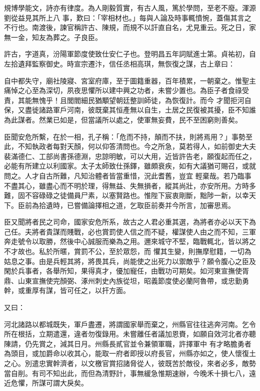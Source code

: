 \begin{pinyinscope}
 規博學能文，詩亦有律度。為人剛毅質實，有古人風，篤於學問，至老不廢。渾源劉從益見其所上八
 事，歎曰：「宰相材也。」每與人論及時事輒憤惋，蓋傷其言之不行也。南渡後，諫官稱許古、陳規，而規不以訐直自名，尤見重云。死之日，家無一金，知友為葬之。子良臣。



 許古，字道真，汾陽軍節度使致仕安仁子也。登明昌五年詞賦進士第。貞祐初，自左拾遺拜監察御史。時宣宗遷汴，信任丞相高琪，無恢復之謀，古上章曰：



 自中都失守，廟社陵寢、宮室府庫，至于圖籍重器，百年積累，一朝棄之。惟聖主痛悼之心至為深切，夙夜思懼所以建中興之功者，未嘗少置也。為臣子者食祿受責，其能無愧乎！且閭閻細民猶顒望朝廷整訓師徒，為恢復計。而今
 才聞拒河自保，又盡徙諸路軍戶河南，彼既棄其恒產無以自生，土居之民復被其擾，臣不知誰為此謀者。然業已如是，但當議所以處之，使軍無妄費，民不至困窮則善矣。



 臣聞安危所繫，在於一相，孔子稱：「危而不持，顛而不扶，則將焉用？」事勢至此，不知執政者每對天顏，何以仰答清問也。今之所急，莫若得人，如前御史大夫裴滿德仁、工部尚書孫德淵，忠諒明敏，可以大用，近皆許告老，願復起而任之，必能有所建立以利國家。太子太師致仕孫鐸，雖頗衰疾，如有大議猶可賜召，或就問之。人才自古所難，凡知治體者皆當重惜，況此耆舊，豈宜
 輕棄哉。若乃臨事不盡其心，雖盡心而不明於理，得無益、失無損者，縱其尚壯，亦安所用。方時多難，固不容碌碌之徒備員尸素，以塞賢路也。惟陛下宸衷剛斷，黜陟一新，以幸天下。臣前為拾遺時，已嘗備論擇相之道，乞取臣前奏并今所言，加審思焉。



 臣又聞將者民之司命，國家安危所系，故古之人君必重其選，為將者亦必以天下為己任。夫將者貴謀而賤戰，必也賞罰使人信之而不疑，權謀使人由之而不知，三軍奔走號令以取勝，然後中心誠服而樂為之用。邇來城守不堅，臨戰輒北，皆以將之不才故也。私於所暱，賞罰不公，至於眾怨，而
 懼其生變，則撫摩慰籍，一切為姑息之事。由是兵輕其將，將畏其兵，尚能使之出死力以禦敵乎？願令腹心之臣及閑於兵事者，各舉所知，果得真才，優加寵任，由戰功可期矣。如河東宣撫使胥鼎、山東宣撫使完顏弼、涿州刺史內族從坦，昭義節度使必蘭阿魯帶，或忠勤勇幹，或重厚有謀，皆可任之，以扞方面。



 又曰：



 河北諸路以都城既失，軍戶盡遷，將謂國家舉而棄之，州縣官往往逃奔河南。乞令所在根括，立期遣還，違者勿復錄用。未嘗離任者議加恩賚，如願自效河北者亦聽陳請，仍先賞之，減其日月。州縣長貳官並令兼領軍職，許擇軍中
 有才略膽勇者為頭目，或加爵命以收其心，能取一府者即授以府長官，州縣亦如之，使人懷復土之心。別遣忠實幹濟者，以文檄官賞招諸脅從人，彼既苦於敵役，來者必多，敵勢當自削。有司不知出此，而但為清野計，事無緩急惟期速辦，今晚禾十損七八，遠近危懼，所謀可謂大戾矣。




\end{pinyinscope}
